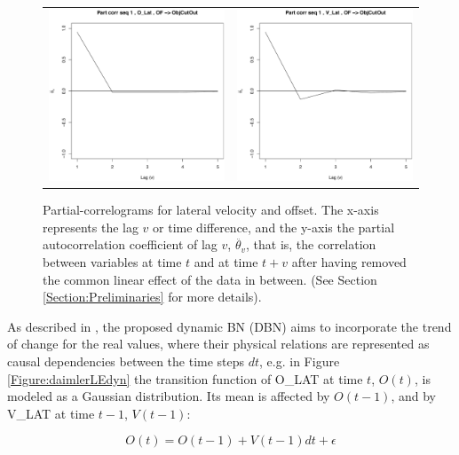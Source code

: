 \begin{figure}
  \centering
    \begin{tabular}{cc}
        \includegraphics[width=60mm]{figures/DaimlerPcorrOBJ_R5Offs.pdf}&
    \includegraphics[width=60mm]{figures/DaimlerPcorrOBJ_R5Vel.pdf}\\
  \end{tabular}
    \caption{\label{Figure:daimlerPartialCorrel}Partial-correlograms for lateral velocity and offset. The x-axis represents the lag $v$ or time difference, and the y-axis the partial autocorrelation coefficient of lag $v$, $\ddot{\theta_v}$, that is, the correlation between variables at time $t$ and at time $t+v$ after having removed the common linear effect of the data in between. (See Section \ref{Section:Preliminaries} for more details).}
\end{figure}


As described in \cite{Weidl2014}, the proposed dynamic BN (DBN) aims to incorporate the trend of change for the real values, where their physical relations are represented as causal dependencies between the time steps $dt$, e.g. in Figure \ref{Figure:daimlerLEdyn} the transition function of O\_LAT at time $t$, $O(t)$, is modeled as a Gaussian distribution. Its mean is affected by $O(t-1)$, and by V\_LAT at time $t-1$, $V(t-1)$:

\begin{equation}
O(t) =O(t-1) +V(t-1)dt +\epsilon
\end{equation}

